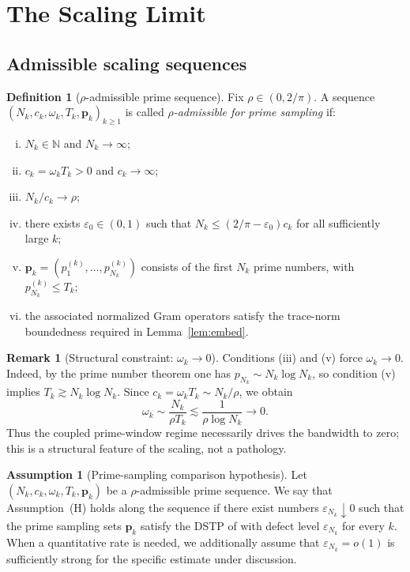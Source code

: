 \documentclass[12pt,a4paper]{amsart}
\theoremstyle{definition}
\newtheorem{definition}[theorem]{Definition}
\newtheorem{remark}[theorem]{Remark}
\newtheorem{assumption}[theorem]{Assumption}
\begin{document}
\section{The Scaling Limit}\label{sec:scaling}

\subsection{Admissible scaling sequences}

\begin{definition}[$\rho$-admissible prime sequence]\label{def:admissible}
Fix $\rho\in(0,2/\pi)$. A sequence
$(N_k,c_k,\omega_k,T_k,\mathbf{p}_k)_{k\geq1}$ is called
\emph{$\rho$-admissible for prime sampling} if:
\begin{enumerate}[(i)]
\item $N_k\in\mathbb N$ and $N_k\to\infty$;
\item $c_k=\omega_kT_k>0$ and $c_k\to\infty$;
\item $N_k/c_k\to\rho$;
\item there exists $\varepsilon_0\in(0,1)$ such that
$N_k\le (2/\pi-\varepsilon_0)c_k$ for all sufficiently large $k$;
\item $\mathbf p_k=(p_1^{(k)},\ldots,p_{N_k}^{(k)})$ consists of the first
$N_k$ prime numbers, with $p_{N_k}^{(k)}\le T_k$;
\item the associated normalized Gram operators satisfy the trace-norm boundedness
required in Lemma~\ref{lem:embed}.
\end{enumerate}
\end{definition}

\begin{remark}[Structural constraint: $\omega_k\to0$]\label{rem:omega_to_zero}
Conditions (iii) and (v) force $\omega_k\to0$.
Indeed, by the prime number theorem one has
$p_{N_k}\sim N_k\log N_k$, so condition (v) implies
$T_k\gtrsim N_k\log N_k$.
Since $c_k=\omega_kT_k\sim N_k/\rho$, we obtain
\[
  \omega_k \sim \frac{N_k}{\rho T_k}
  \lesssim \frac{1}{\rho\log N_k}\to0.
\]
Thus the coupled prime-window regime necessarily drives the bandwidth to zero;
this is a structural feature of the scaling, not a pathology.
\end{remark}

\begin{assumption}[Prime-sampling comparison hypothesis]\label{ass:primeT2}
Let $(N_k,c_k,\omega_k,T_k,\mathbf p_k)$ be a $\rho$-admissible prime sequence.
We say that Assumption~\textup{(H)} holds along the sequence if there exist numbers
$\varepsilon_{N_k}\downarrow0$ such that the prime sampling sets $\mathbf p_k$
satisfy the DSTP of \cite{PaperI} with defect level $\varepsilon_{N_k}$
for every $k$.
When a quantitative rate is needed, we additionally assume that
$\varepsilon_{N_k}=o(1)$ is sufficiently strong for the specific estimate under discussion.
\end{assumption}
\end{document}
